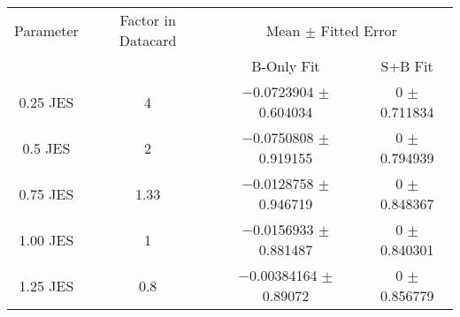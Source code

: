 \begin{scriptsize}
\begin{table}
\centering
\begin{tabular}{cccc}
\toprule
Parameter & Factor in Datacard & \multicolumn{2}{c}{{Mean $\pm$ Fitted Error}}\\
 & & {B-Only Fit} & {S+B Fit}\\
\midrule
\num[round-precision=2]{0.25} JES & 4 & \num{-0.0723904} $\pm$ \num{0.604034} & \num{0} $\pm$ \num{0.711834}\\
\num[round-precision=2]{0.5} JES & 2 & \num{-0.0750808} $\pm$ \num{0.919155} & \num{0} $\pm$ \num{0.794939}\\
\num[round-precision=2]{0.75} JES & \num[round-precision=2]{1.33} & \num{-0.0128758} $\pm$ \num{0.946719} & \num{0} $\pm$ \num{0.848367}\\
\num[round-precision=2]{1.00} JES & 1 & \num{-0.0156933} $\pm$ \num{0.881487} & \num{0} $\pm$ \num{0.840301}\\
\num[round-precision=2]{1.25} JES & \num[round-precision=2]{0.8} & \num{-0.00384164} $\pm$ \num{0.89072} & \num{0} $\pm$ \num{0.856779}\\

\bottomrule
\end{tabular}
\end{table}
\end{scriptsize}
